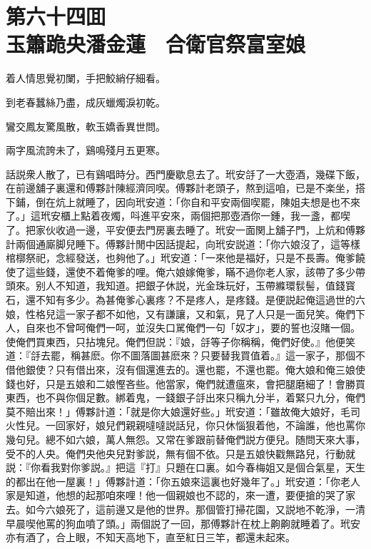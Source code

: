 
\chapter*{第六十四囬　\\玉簫跪央潘金蓮　合衛官祭富室娘}


\begin{myquote}
着人情思覺初闌，手把鮫綃仔細看。

到老春蠶絲乃盡，成灰蠟燭淚初乾。

鸞交鳳友驚風散，軟玉嬌香異世問。

兩字風流誇未了，鷄鳴殘月五更寒。
\end{myquote}

話説衆人散了，已有鷄唱時分。西門慶歇息去了。玳安㧱了一大壺酒，幾碟下飯，在前邊舖子裏還和傅夥計陳經濟同喫。傅夥計老頭子，熬到這咱，已是不楽坐，搭下鋪，倒在炕上就睡了，因向玳安道：「你自和平安兩個喫罷，陳姐夫想是也不來了。」這玳安櫃上點着夜燭，呌進平安來，兩個把那壺酒你一鍾，我一盞，都喫了。把家伙收過一邊，平安便去門房裏去睡了。玳安一面関上舖子門，上炕和傅夥計兩個通廝脚兒睡下。傅夥計閒中因話提起，向玳安説道：「你六娘沒了，這等樣棺槨祭祀，念經發送，也夠他了。」玳安道：「一來他是福好，只是不長壽。俺爹饒使了這些錢，還使不着俺爹的哩。俺六娘嫁俺爹，瞞不過你老人家，該帶了多少帶頭來。别人不知道，我知道。把銀子休説，光金珠玩好，玉帶縧環䯼髻，值錢寳石，還不知有多少。為甚俺爹心裏疼？不是疼人，是疼錢。是便説起俺這過世的六娘，性格兒這一家子都不如他，又有謙讓，又和氣，見了人只是一面兒笑。俺們下人，自來也不曾呵俺們一呵，並沒失口駡俺們一句「奴才」，要的誓也沒賭一個。使俺們買東西，只拈塊兒。俺們但説：『娘，㧱等子你稱稱，俺們好使。』他便笑道：『㧱去罷，稱甚麽。你不圖落圖甚麽來？只要替我買值着。』這一家子，那個不借他銀使？只有借出來，沒有個還進去的。還也罷，不還也罷。俺大娘和俺三娘使錢也好，只是五娘和二娘慳吝些。他當家，俺們就遭瘟來，會把腿磨細了！會勝買東西，也不與你個足數。綁着鬼，一錢銀子㧱出來只稱九分半，着緊只九分，俺們莫不賠出來！」傅夥計道：「就是你大娘還好些。」玳安道：「雖故俺大娘好，毛司火性兒。一回家好，娘兒們親親噠噠説話兒，你只休惱狠着他，不論誰，他也罵你幾句兒。總不如六娘，萬人無怨。又常在爹跟前替俺們説方便兒。随問天來大事，受不的人央。俺們央他央兒對爹説，無有個不依。只是五娘快戳無路兒，行動就説：『你看我對你爹説。』把這『打』只題在口裏。如今春梅姐又是個合氣星，天生的都出在他一屋裏！」傅夥計道：「你五娘來這裏也好幾年了。」玳安道：「你老人家是知道，他想的起那咱來哩！他一個親娘也不認的，來一遭，要便搶的哭了家去。如今六娘死了，這前邊又是他的世界。那個管打掃花園，又説地不乾淨，一清早晨喫他罵的狗血噴了頭。」兩個説了一回，那傅夥計在枕上齁齁就睡着了。玳安亦有酒了，合上眼，不知天高地下，直至紅日三竿，都還未起來。

